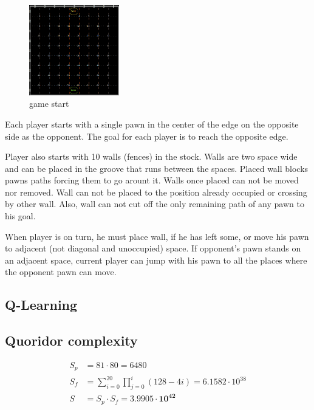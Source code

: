\documentclass[12pt, oneside]{book}
\begin{document}
    \begin{figure}
      \vspace*{-0.98cm}
      \centering
      \includegraphics[width=0.35\textwidth]{start.png}
      \vspace*{-0.60cm}
      \caption{game start}
      \label{fig:game_start}
      \vspace*{-1.40cm}
    \end{figure}

    Each player starts with a single pawn in the center of the edge on the
    opposite side as the opponent.
    The goal for each player is to reach the opposite edge.

    Player also starts with 10 walls (fences) in the stock.
    Walls are two space wide and can be placed in the groove that runs between
    the spaces.
    Placed wall blocks pawns paths forcing them to go arount it.
    Walls once placed can not be moved nor removed.
    Wall can not be placed to the position already occupied or crossing by
    other wall.
    Also, wall can not cut off the only remaining path of any pawn to his goal.

    When player is on turn, he must place wall, if he has left some, or move
    his pawn to adjacent (not diagonal and unoccupied) space.
    If opponent's pawn stands on an adjacent space, current player can jump
    with his pawn to all the places where the opponent pawn can move.

  \subsection{Q-Learning}

  \subsection{Quoridor complexity}
    \begin{figure}
      \vspace*{-1.45cm}
      \begin{equation}
        \label{eqn:mertensestimate}
        \begin{aligned}
          S_p &= 81 \cdot 80 = 6480
          \\
          S_f &= \sum_{i=0}^{20}\prod_{j=0}^{i}(128 - 4i) = 6.1582\cdot10^{38}
          \\
          S &= S_p \cdot S_f = \mathbf{3.9905 \cdot 10 ^{42}}
        \end{aligned}
      \end{equation}
      \vspace*{-2.45cm}
    \end{figure}
\end{document}
